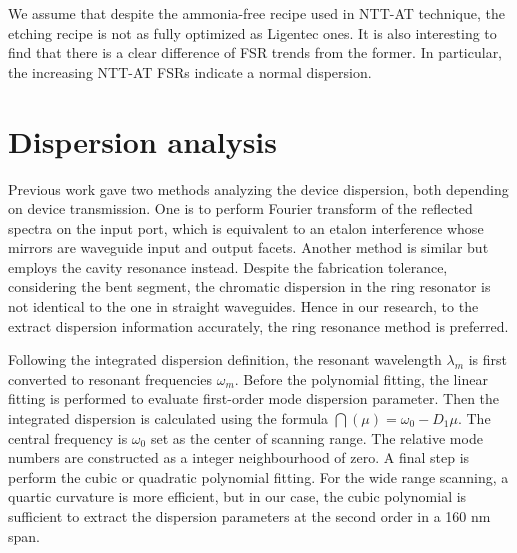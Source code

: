 We assume that despite the ammonia-free recipe used in NTT-AT technique, the etching recipe is not as fully optimized as Ligentec ones. It is also interesting to find that there is a clear difference of FSR trends from the former. In particular, the increasing NTT-AT FSRs indicate a normal dispersion.

%    

%    


\section{Dispersion analysis}

Previous work \cite{Sunada2018} gave two methods analyzing the device dispersion, both depending on device transmission. One is to perform Fourier transform of the reflected spectra on the input port, which is equivalent to an etalon interference whose mirrors are waveguide input and output facets. Another method is similar but employs the cavity resonance instead. Despite the fabrication tolerance, considering the bent segment, the chromatic dispersion in the ring resonator is not identical to the one in straight waveguides. Hence in our research, to the extract dispersion information accurately, the ring resonance method is preferred. 

Following the integrated dispersion definition, the resonant wavelength $\lambda_m$ is first converted to resonant frequencies $\omega_m$. Before the polynomial fitting, the linear fitting is performed to evaluate first-order mode dispersion parameter. Then the integrated dispersion is calculated using the formula $ \dint(\mu) = \omega_0 - D_1 \mu$. The central frequency is $\omega_0$ set as the center of scanning range. The relative mode numbers are constructed as a integer neighbourhood of zero. A final step is perform the cubic or quadratic polynomial fitting. For the wide range scanning, a quartic curvature is more efficient, but in our case, the cubic polynomial is sufficient to extract the dispersion parameters at the second order in a 160 nm span.


